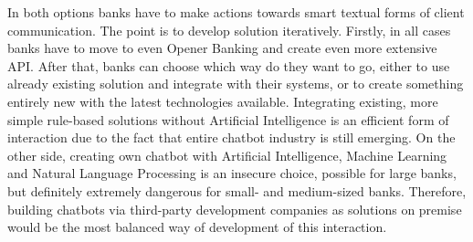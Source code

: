 In both options banks have to make actions towards smart textual forms of client communication.
The point is to develop solution iteratively.
Firstly, in all cases banks have to move to even Opener Banking and create even more extensive API.
After that, banks can choose which way do they want to go, either to use already existing solution and integrate with their systems, or to create something entirely new with the latest technologies available.
Integrating existing, more simple rule-based solutions without Artificial Intelligence is an efficient form of interaction due to the fact that entire chatbot industry is still emerging.
On the other side, creating own chatbot with Artificial Intelligence, Machine Learning and Natural Language Processing is an insecure choice, possible for large banks, but definitely extremely dangerous for small- and medium-sized banks.
Therefore, building chatbots via third-party development companies as solutions on premise would be the most balanced way of development of this interaction.
